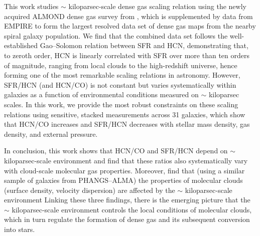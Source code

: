 \documentclass[letter, longauth]{aa} %
\begin{document}
This work studies $\sim$ kiloparsec-scale dense gas scaling relation using the newly acquired ALMOND dense gas survey from \citet{Neumann2023a}, which is supplemented by data from EMPIRE to form the largest resolved data set of dense gas maps from the nearby spiral galaxy population.
We find that the combined data set follows the well-established Gao--Solomon relation between SFR and HCN, demonstrating that, to zeroth order, HCN is linearly correlated with SFR over more than ten orders of magnitude, ranging from local clouds to the high-redshift universe, hence forming one of the most remarkable scaling relations in astronomy.
However, SFR/HCN (and HCN/CO) is not constant but varies systematically within galaxies as a function of environmental conditions measured on $\sim$ kiloparsec scales.
In this work, we provide the most robust constraints on these scaling relations using sensitive, stacked measurements across 31 galaxies, which show that HCN/CO increases and SFR/HCN decreases with stellar mass density, gas density, and external pressure.

In conclusion, this work shows that HCN/CO and SFR/HCN depend on $\sim$ kiloparsec-scale environment and \citet{Neumann2023a} find that these ratios also systematically vary with cloud-scale molecular gas properties.
Moreover, \citet{Sun2020a, Sun2020b} find that (using a similar sample of galaxies from PHANGS--ALMA) the properties of molecular clouds (surface density, velocity dispersion) are affected by the $\sim$ kiloparsec-scale environment
Linking these three findings, there is the emerging picture that the $\sim$ kiloparsec-scale environment controls the local conditions of molecular clouds, which in turn regulate the formation of dense gas and its subsequent conversion into stars.
\end{document}
